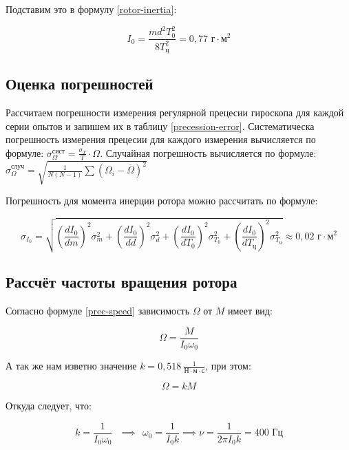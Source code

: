 \documentclass[a4paper,12pt]{article}
\begin{document}
Подставим это в формулу \eqref{rotor-inertia}:

\begin{equation}
    I_{0} = \frac{m d^2 T_{0}^2}{8T_{\text{ц}}^2} = 0,77 \text{ г} \cdot \text{м}^2
\end{equation}

\subsection{Оценка погрешностей}

Рассчитаем погрешности измерения регулярной прецесии гироскопа для каждой серии опытов и запишем их в таблицу \ref{precession-error}. Систематическа погрешность измерения прецесии для каждого измерения вычисляется по формуле: $\sigma_\Omega^\text{сист} = \frac{\sigma_T}{T} \cdot \Omega$. Случайная погрешность вычисляется по формуле: \\ $ \sigma_{\Omega}^\text{случ} = \sqrt{\frac{1}{N  (N-1)}\sum(\Omega_i-\overline{\Omega})^2}$

Погрешность для момента инерции ротора можно рассчитать по формуле:

\begin{equation}
    \sigma_{I_0} = \sqrt{
    \left( \frac{dI_0}{dm} \right) ^ 2 \sigma_{m}^2 + 
    \left( \frac{dI_0}{dd} \right) ^ 2 \sigma_{d}^2 + 
    \left( \frac{dI_0}{dT_0} \right) ^ 2 \sigma_{T_0}^2 + 
    \left( \frac{dI_0}{dT_{\text{ц}}} \right) ^ 2 \sigma_{T_{\text{ц}}}^2
    } \approx 0,02 \text{ г} \cdot \text{м}^2
\end{equation}

\subsection{Рассчёт частоты вращения ротора}

Согласно формуле \eqref{prec-speed} зависимость $\Omega$ от $M$ имеет вид:

\begin{equation}
    \Omega = \frac{M}{I_0 \omega_0}
\end{equation}

А так же нам изветно значение $k = 0,518 \ \frac{1}{\text{Н} \cdot \text{м} \cdot \text{с}}$, при этом:

\begin{equation}
    \Omega = k M
\end{equation}

Откуда следует, что:

\begin{equation}
    k = \frac{1}{I_0 \omega_0} \ \ \ \implies \ \ \omega_0 = \frac{1}{I_0 k} \implies \nu = \frac{1}{2 \pi I_0 k} = 400 \text{ Гц}
\end{equation}
\end{document}
